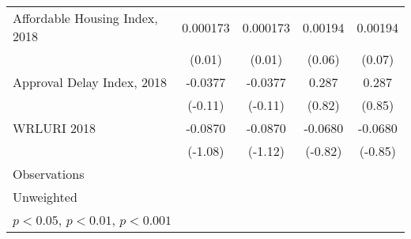 \begin{table}[htbp]
\begin{tabular}{l*{4}{c}}
\addlinespace
Affordable Housing Index, 2018&    0.000173         &    0.000173         &     0.00194         &     0.00194         \\
                    &      (0.01)         &      (0.01)         &      (0.06)         &      (0.07)         \\
\addlinespace
Approval Delay Index, 2018&     -0.0377         &     -0.0377         &       0.287         &       0.287         \\
                    &     (-0.11)         &     (-0.11)         &      (0.82)         &      (0.85)         \\
\addlinespace
WRLURI 2018         &     -0.0870         &     -0.0870         &     -0.0680         &     -0.0680         \\
                    &     (-1.08)         &     (-1.12)         &     (-0.82)         &     (-0.85)         \\
\midrule
Observations        &                     &                     &                     &                     \\
\bottomrule
\multicolumn{5}{l}{\footnotesize Unweighted}\\
\multicolumn{5}{l}{\footnotesize \sym{*} \(p<0.05\), \sym{**} \(p<0.01\), \sym{***} \(p<0.001\)}\\
\end{tabular}
\end{table}
